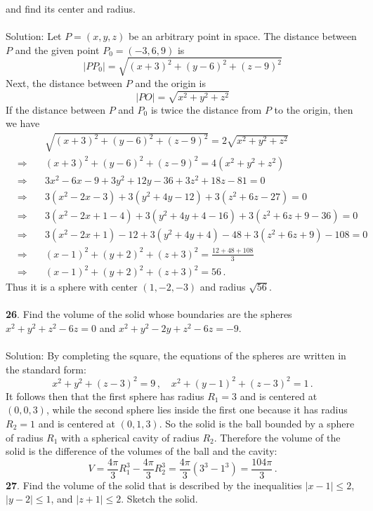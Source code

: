 \documentclass[12pt]{amsbook}
\begin{document}
and find its center and radius.\\
\\
{\sc Solution}:
Let $P=(x,y,z)$ be an arbitrary point in space. The distance between $P$ and the given point $P_0=(-3,6,9)$ is 
$$|PP_0|=\sqrt{(x+3)^2+(y-6)^2+(z-9)^2}$$
Next, the distance between $P$ and the origin is 
$$|PO|=\sqrt{x^2+y^2+z^2}$$
If the distance between $P$ and $P_0$ is twice the distance from $P$ to the origin, then we have
\begin{eqnarray*}
&&\quad \sqrt{(x+3)^2+(y-6)^2+(z-9)^2}=2\sqrt{x^2+y^2+z^2}\\
&\Rightarrow&\quad
(x+3)^2+(y-6)^2+(z-9)^2=4(x^2+y^2+z^2)\\
&\Rightarrow&\quad
3x^2-6x-9+3y^2+12y-36+3z^2+18z-81=0\\
&\Rightarrow&\quad
3(x^2-2x-3)+3(y^2+4y-12)+3(z^2+6z-27)=0\\
&\Rightarrow&\quad
3(x^2-2x+1-4)+3(y^2+4y+4-16)+3(z^2+6z+9-36)=0\\
&\Rightarrow&\quad
3(x^2-2x+1)-12+3(y^2+4y+4)-48+3(z^2+6z+9)-108=0\\
&\Rightarrow&\quad
(x-1)^2+(y+2)^2+(z+3)^2=\frac{12+48+108}{3}\\
&\Rightarrow&\quad
(x-1)^2+(y+2)^2+(z+3)^2=56\,.
\end{eqnarray*}
Thus it is a sphere with center $(1,-2,-3)$ and radius $\sqrt{56}$.
\\
\\
{\small\bf 26}. Find the volume of the solid whose boundaries are
the spheres
$x^2+y^2+z^2-6z=0$ and $x^2+y^2-2y+z^2-6z=-9$.\\
\\
{\sc Solution}: By completing the square, the equations of the spheres are written in the
standard form:
$$
x^2 + y^2 + (z - 3)^2 = 9\,,\quad x^2 + (y - 1)^2 + (z - 3)^2 = 1\,.
$$
It follows then that the first sphere has radius $R_1 = 3$ 
and is centered at $(0, 0, 3)$, while the
second sphere lies inside the first one because 
it has radius $R_2 = 1$ and is centered at $(0, 1, 3)$.
So the solid is the ball bounded by a sphere of radius $R_1$ with a spherical cavity of radius $R_2$.
Therefore the volume of the solid is the difference of the volumes of the ball and the cavity:
$$
V=\frac{4\pi}{3}R_1^3-\frac{4\pi}{3}R_2^3=
\frac{4\pi}{3}(3^3-1^3)=\frac{104\pi}{3}\,.
$$
{\small\bf 27}. Find the volume of the solid that is described 
by the inequalities $|x-1|\leq 2$, $|y-2|\leq 1$, and 
$|z+1|\leq 2$. Sketch the solid.
\\
\\
\end{document}
